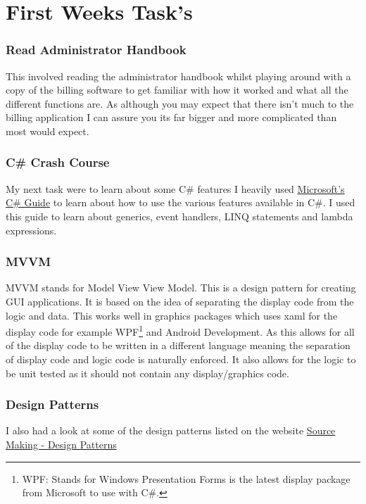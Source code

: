 \section{First Weeks Task's}{
	\subsubsection*{Read Administrator Handbook}{
		This involved reading the administrator handbook whilst playing around with a copy of the billing software to get familiar with how it worked and what all the different functions are. As although you may expect that there isn't much to the billing application I can assure you its far bigger and more complicated than most would expect.
	}
	\subsubsection*{C\# Crash Course}{
		My next task were to learn about some C\# features I heavily used \href{https://docs.microsoft.com/en-gb/dotnet/csharp/programming-guide/}{Microsoft's C\# Guide}\cite{CSProgrammingGuide2017} to learn about how to use the various features available in C\#. I used this guide to learn about generics, event handlers, LINQ statements and lambda expressions.
	}
	\subsubsection*{MVVM}{
		MVVM stands for Model View View Model. This is a design pattern for creating GUI applications. It is based on the idea of separating the display code from the logic and data. This works well in graphics packages which uses xaml for the display code for example WPF\footnote{WPF: Stands for Windows Presentation Forms is the latest display package from Microsoft to use with C\#.} and Android Development. As this allows for all of the display code to be written in a different language meaning the separation of display code and logic code is naturally enforced. It also allows for the logic to be unit tested as it should not contain any display/graphics code.
	}
	\subsubsection*{Design Patterns}{
		I also had a look at some of the design patterns listed on the website \href{https://sourcemaking.com/design_patterns}{Source Making - Design Patterns} \cite{DesignPatterns2007}
	}
}